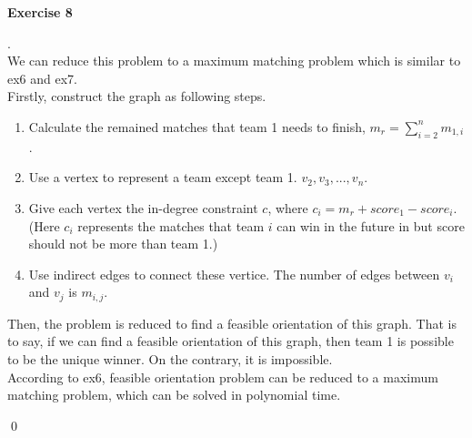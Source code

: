 \documentclass[12pt, notitlepage]{article}
\newenvironment{sol}
  {\par\vspace{3mm}\noindent{\it Solution}.}{\qed}
\begin{document}
\textbf{Exercise 8}
\begin{sol}\\
We can reduce this problem to a maximum matching problem which is similar to ex6 and ex7.\\
Firstly, construct the graph as following steps.
\begin{enumerate}[1.]
 	\item Calculate the remained matches that team 1 needs to finish, $m_r = \sum_{i=2}^{n}m_{1,i}$.
 	\item Use a vertex to represent a team except team 1. $v_2,v_3,...,v_n$.
 	\item Give each vertex the in-degree constraint $c$, where $c_i = m_r + score_1 - score_i$. (Here $c_i$ represents the matches that team $i$ can win in the future in but score should not be more than team 1.)
 	\item Use indirect edges to connect these vertice. The number of edges between $v_i$ and $v_j$ is $m_{i,j}$.
\end{enumerate}
 
Then, the problem is reduced to find a feasible orientation of this graph. That is to say, if we can find a feasible orientation of this graph, then team 1 is possible to be the unique winner. On the contrary, it is impossible.\\
According to ex6, feasible orientation problem can be reduced to a maximum matching problem, which can be solved in polynomial time.



\end{sol}\\
\end{document}
